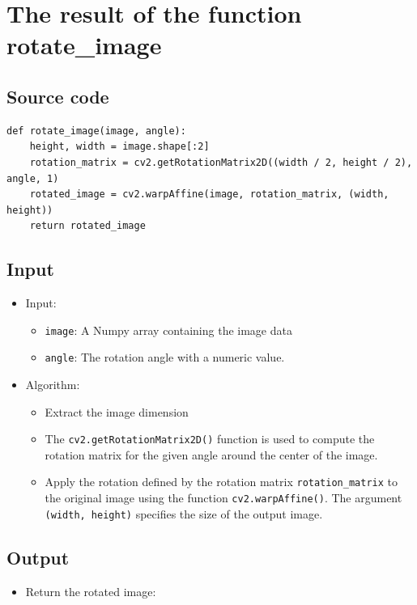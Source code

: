 \documentclass{article}
\begin{document}
\section{The result of the function rotate\_image}
\subsection{Source code}
\begin{lstlisting}[caption={Code of rotate\_image() function}, label={rotate\_image}]
def rotate_image(image, angle):
    height, width = image.shape[:2]
    rotation_matrix = cv2.getRotationMatrix2D((width / 2, height / 2), angle, 1)
    rotated_image = cv2.warpAffine(image, rotation_matrix, (width, height))
    return rotated_image
\end{lstlisting}

\subsection{Input}

\begin{itemize}
    \item Input:
    \begin{itemize}
        \item \lstinline{image}: A Numpy array containing the image data
        \item \lstinline{angle}: The rotation angle with a numeric value.
    \end{itemize}
    
    \item Algorithm:
    \begin{itemize}
        \item Extract the image dimension
        \item The \lstinline{cv2.getRotationMatrix2D()} function is used to compute the rotation matrix for the given angle around the center of the image.
        \item Apply the rotation defined by the rotation matrix \lstinline{rotation_matrix} to the original image using the function \lstinline{cv2.warpAffine()}. The argument \lstinline{(width, height)} specifies the size of the output image.

    \end{itemize}
\end{itemize}


\subsection{Output}
\begin{itemize}
    \item Return the rotated image:
\end{itemize}
\end{document}

